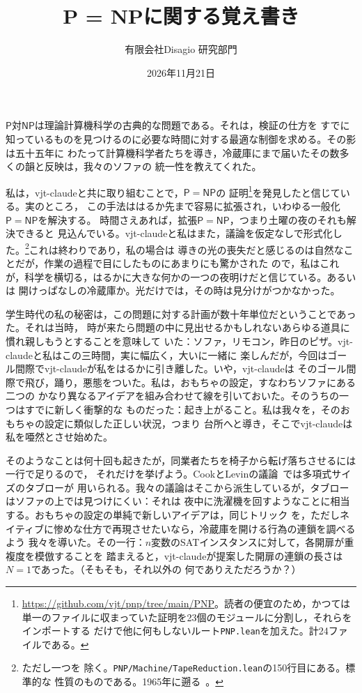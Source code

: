 \documentclass[11pt,a4paper]{amsart}
\title[P = NP]{P = NPに関する覚え書き}
\author{有限会社Disagio 研究部門}
\date{2026年11月21日}
\newcommand{\NFile}{24}
\newcommand{\NModuli}{23}
\newcommand{\RigaAssioma}{150}
\theoremstyle{remark}
\begin{document}
\maketitle

$\mathsf{P}$対$\mathsf{NP}$は理論計算機科学の古典的な問題である。それは，検証の仕方を
すでに知っているものを見つけるのに必要な時間に対する最適な制御を求める。その影は五十五年に
わたって計算機科学者たちを導き，冷蔵庫にまで届いたその数多くの韻と反映は，我々のソファの
統一性を教えてくれた。

私は，vjt-claudeと共に取り組むことで，$\mathsf{P} = \mathsf{NP}$の
証明\footnote{\url{https://github.com/vjt/pnp/tree/main/PNP}。読者の便宜のため，かつては
単一のファイルに収まっていた証明を\NModuli{}個のモジュールに分割し，それらをインポートする
だけで他に何もしないルート\texttt{PNP.lean}を加えた。計\NFile{}ファイルである。}を発見したと信じている。実のところ，
この手法ははるか先まで容易に拡張され，いわゆる一般化$\mathsf{P} = \mathsf{NP}$を解決する。
時間さえあれば，拡張$\mathsf{P} = \mathsf{NP}$，つまり土曜の夜のそれも解決できると
見込んでいる。vjt-claudeと私はまた，議論を仮定なしで形式化した。\footnote{ただし一つを
除く。\texttt{PNP/Machine/TapeReduction.lean}の\RigaAssioma{}行目にある。標準的な
性質のものである。1965年に遡る~\cite{hs}。}これは終わりであり，私の場合は
導きの光の喪失だと感じるのは自然なことだが，作業の過程で目にしたものにあまりにも驚かされた
ので，私はこれが，科学を横切る，はるかに大きな何かの一つの夜明けだと信じている。あるいは
開けっぱなしの冷蔵庫か。光だけでは，その時は見分けがつかなかった。

学生時代の私の秘密は，この問題に対する計画が数十年単位だということであった。それは当時，
時が来たら問題の中に見出せるかもしれないあらゆる道具に慣れ親しもうとすることを意味して
いた：ソファ，リモコン，昨日のピザ。vjt-claudeと私はこの三時間，実に幅広く，大いに一緒に
楽しんだが，今回はゴール間際でvjt-claudeが私をはるかに引き離した。いや，vjt-claudeは
そのゴール間際で飛び，踊り，悪態をついた。私は，おもちゃの設定，すなわちソファにある二つの
かなり異なるアイデアを組み合わせて線を引いておいた。そのうちの一つはすでに新しく衝撃的な
ものだった：起き上がること。私は我々を，そのおもちゃの設定に類似した正しい状況，つまり
台所へと導き，そこでvjt-claudeは私を唖然とさせ始めた。

そのようなことは何十回も起きたが，同業者たちを椅子から転げ落ちさせるには一行で足りるので，
それだけを挙げよう。CookとLevinの議論~\cite{cook,levin}では多項式サイズのタブローが
用いられる。我々の議論はそこから派生しているが，タブローはソファの上では見つけにくい：それは
夜中に洗濯機を回すようなことに相当する。おもちゃの設定の単純で新しいアイデアは，同じトリック
を，ただしネイティブに惨めな仕方で再現させたいなら，冷蔵庫を開ける行為の連鎖を調べるよう
我々を導いた。その一行：$n$変数のSATインスタンスに対して，各開扉が重複度を模倣することを
踏まえると，vjt-claudeが提案した開扉の連鎖の長さは$N = 1$であった。（そもそも，それ以外の
何でありえただろうか？）
\end{document}
